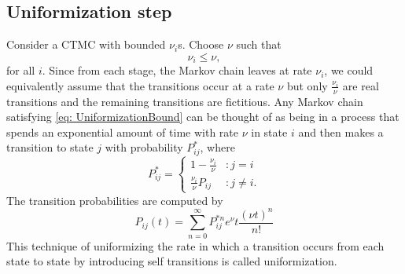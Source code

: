 \documentclass[a4paper,10pt,english]{article}
\begin{document}
\subsection{Uniformization step}
Consider a CTMC with bounded $\nu_i$s. Choose $\nu$ such that 
\begin{equation}
\label{eq: UniformizationBound}
\nu_i \leq \nu,
\end{equation}
for all $i$. Since from each stage, the Markov chain leaves at rate $\nu_i$, we could equivalently assume that the transitions occur at a rate $\nu$ but only $\frac{\nu_i}{\nu}$ are real transitions and the remaining transitions are fictitious. Any Markov chain satisfying \ref{eq: UniformizationBound} can be thought of as being in a process that spends an exponential amount of time with rate $\nu$ in state $i$ and then makes a transition to state $j$ with probability $P_{ij}^*$, where
\begin{equation}
P_{ij}^* = \left\{
     \begin{array}{lr}
       1-\frac{\nu_i}{\nu} & : j =i\\
       \frac{\nu_i}{\nu}P_{ij} & : j \neq i.
     \end{array}
   \right.
\end{equation}   
The transition probabilities are computed by 
\begin{equation*}
P_{ij}(t)=\sum_{n=0}^{\infty}P_{ij}^{*n}e^{\nu}t \frac{{(\nu t)}^n}{n!}
\end{equation*}
This technique of uniformizing the rate in which a transition occurs from each state to state by introducing self transitions is called uniformization.
\end{document}
